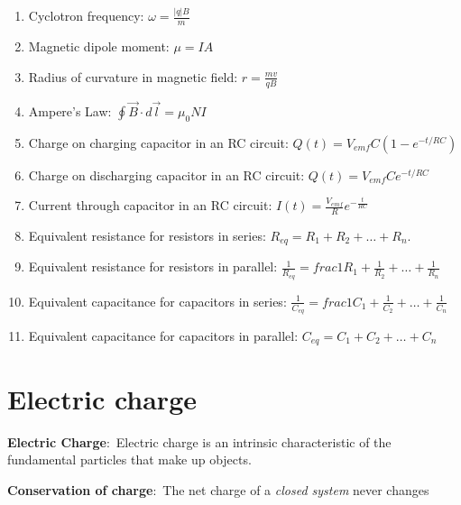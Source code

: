 \documentclass[nobib]{tufte-handout}
\newcommand{\defn}[2]{\noindent\textbf{#1}:\ #2}
\begin{document}
\begin{enumerate}
    \item Cyclotron frequency: $\omega = \frac{|q|B}{m}$
    \item Magnetic dipole moment: $\mu = IA$
    \item Radius of curvature in magnetic field: $r = \frac{mv}{qB}$
    \item Ampere's Law: $\oint \vec{B} \cdot d\vec{l} = \mu_0 NI$
    \item Charge on charging capacitor in an RC circuit: $Q(t) = V_{emf} C (1-e^{-t/RC})$
    \item Charge on discharging capacitor in an RC circuit: $Q(t) = V_{emf} C e^{-t/RC}$
    \item Current through capacitor in an RC circuit: $I(t) = \frac{V_{emf}}{R}e^{-\frac{t}{RC}}$
    \item Equivalent resistance for resistors in series: $R_{eq} = R_1 + R_2 + \dots + R_n$. 
    \item Equivalent resistance for resistors in parallel: $\frac{1}{R_{eq}} =frac{1}{R_1} + \frac{1}{R_2} + \dots + \frac{1}{R_n}$
    \item Equivalent capacitance for capacitors in series: $\frac{1}{C_{eq}} =frac{1}{C_1} + \frac{1}{C_2} + \dots + \frac{1}{C_n}$
    \item Equivalent capacitance for capacitors in parallel: $C_{eq} = C_1 + C_2 + \dots + C_n$
\end{enumerate}

\pagebreak

\pagebreak 

\section{Electric charge}

\defn{Electric Charge}{Electric charge is an intrinsic characteristic of the
fundamental particles that make up objects.}


\defn{Conservation of charge}{The net charge of a \emph{closed system} never changes}
\end{document}
